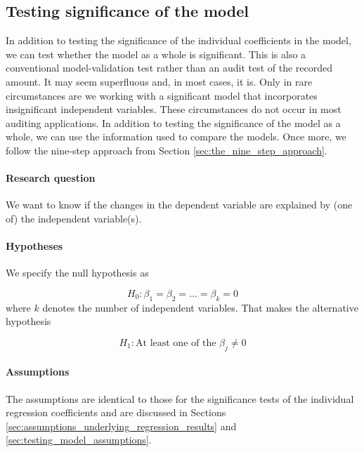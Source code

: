 
\subsection{Testing significance of the model} %
\label{sub:testing_significance_of_the_model}

In addition to testing the significance of the individual coefficients in the model, we can test whether the model as a whole is significant. This is also a conventional model-validation test rather than an audit test of the recorded amount. It may seem superfluous and, in most cases, it is. Only in rare circumstances are we working with a significant model that incorporates insignificant independent variables. These circumstances do not occur in most auditing applications. In addition to testing the significance of the model as a whole, we can use the information used to compare the models. Once more, we follow the nine-step approach from Section \ref{sec:the_nine_step_approach}.

\paragraph{Research question} We want to know if the changes in the dependent variable are explained by (one of) the independent variable(s). 

\paragraph{Hypotheses} We specify the null hypothesis as

\begin{equation*}
H_0 : \beta_1 = \beta_2 = \ldots = \beta_k = 0
\end{equation*}
where $k$ denotes the number of independent variables. That makes the alternative hypothesis

\begin{equation*}
H_1 : \text{At least one of the } \beta_j \neq 0
\end{equation*}


\paragraph{Assumptions} The assumptions are identical to those for the significance tests of the individual regression coefficients and are discussed in Sections \ref{sec:assumptions_underlying_regression_results} and \ref{sec:testing_model_assumptions}.


